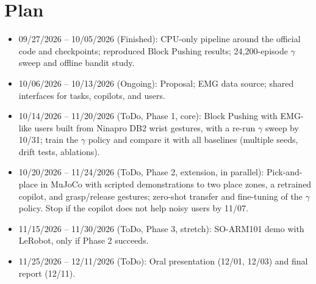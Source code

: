 \documentclass{article}
\begin{document}

\section{Plan}

\begin{itemize}\setlength{\itemsep}{1pt}
  \item 09/27/2026 -- 10/05/2026 (Finished): CPU-only pipeline around the official code and checkpoints; reproduced Block Pushing results; 24{,}200-episode $\gamma$ sweep and offline bandit study.
  \item 10/06/2026 -- 10/13/2026 (Ongoing): Proposal; EMG data source; shared interfaces for tasks, copilots, and users.
  \item 10/14/2026 -- 11/20/2026 (ToDo, Phase 1, core): Block Pushing with EMG-like users built from Ninapro DB2 wrist gestures, with a re-run $\gamma$ sweep by 10/31; train the $\gamma$ policy and compare it with all baselines (multiple seeds, drift tests, ablations).
  \item 10/20/2026 -- 11/24/2026 (ToDo, Phase 2, extension, in parallel): Pick-and-place in MuJoCo with scripted demonstrations to two place zones, a retrained copilot, and grasp/release gestures; zero-shot transfer and fine-tuning of the $\gamma$ policy. Stop if the copilot does not help noisy users by 11/07.
  \item 11/15/2026 -- 11/30/2026 (ToDo, Phase 3, stretch): SO-ARM101 demo with LeRobot, only if Phase 2 succeeds.
  \item 11/25/2026 -- 12/11/2026 (ToDo): Oral presentation (12/01, 12/03) and final report (12/11).
\end{itemize}



\end{document}
